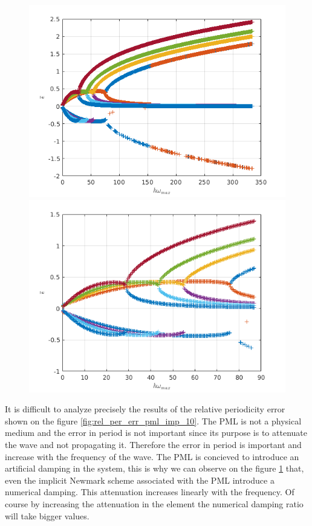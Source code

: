 \begin{itemize}
\begin{figure}[H]
\centering
\begin{minipage}{.5\textwidth}
  \centering
  \includegraphics[width=1.\linewidth]{images/num_damp_pml_imp_10.png}
\end{minipage}%
\begin{minipage}{.5\textwidth}
  \centering
  \includegraphics[width=1.\linewidth]{images/num_damp_pml_imp_10_80.png}
\end{minipage}
\label{fig:num_damp_pml_imp_10}
\end{figure} 
It is difficult to analyze precisely the results of the relative periodicity error shown on the figure \ref{fig:rel_per_err_pml_imp_10}. The PML is not a physical medium and the error in period is not important since its purpose is to attenuate the wave and not propagating it. Therefore the error in period is important and increase with the frequency of the wave. The PML is concieved to introduce an artificial damping in the system, this is why we can observe on the figure \ref{fig:num_damp_pml_imp_10} that, even the implicit Newmark scheme associated with the PML introduce a numerical damping. This attenuation increases linearly with the frequency. Of course by increasing the attenuation in the element the numerical damping ratio will take bigger values.

\end{itemize}
